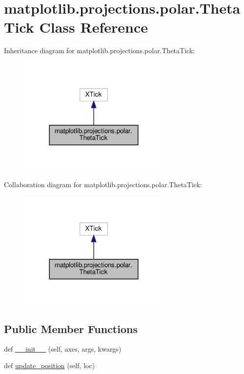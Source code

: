 \hypertarget{classmatplotlib_1_1projections_1_1polar_1_1ThetaTick}{}\section{matplotlib.\+projections.\+polar.\+Theta\+Tick Class Reference}
\label{classmatplotlib_1_1projections_1_1polar_1_1ThetaTick}


Inheritance diagram for matplotlib.\+projections.\+polar.\+Theta\+Tick\+:
\nopagebreak
\begin{figure}[H]
\begin{center}
\leavevmode
\includegraphics[width=216pt]{classmatplotlib_1_1projections_1_1polar_1_1ThetaTick__inherit__graph}
\end{center}
\end{figure}


Collaboration diagram for matplotlib.\+projections.\+polar.\+Theta\+Tick\+:
\nopagebreak
\begin{figure}[H]
\begin{center}
\leavevmode
\includegraphics[width=216pt]{classmatplotlib_1_1projections_1_1polar_1_1ThetaTick__coll__graph}
\end{center}
\end{figure}
\subsection*{Public Member Functions}
\begin{DoxyCompactItemize}
\item 
def \hyperlink{classmatplotlib_1_1projections_1_1polar_1_1ThetaTick_ac6a6b6282acf55443d8e755c021b3afc}{\+\_\+\+\_\+init\+\_\+\+\_\+} (self, axes, args, kwargs)
\item 
def \hyperlink{classmatplotlib_1_1projections_1_1polar_1_1ThetaTick_af3d06bbaeacf0a5c6e14b3acdae3934f}{update\+\_\+position} (self, loc)
\end{DoxyCompactItemize}


